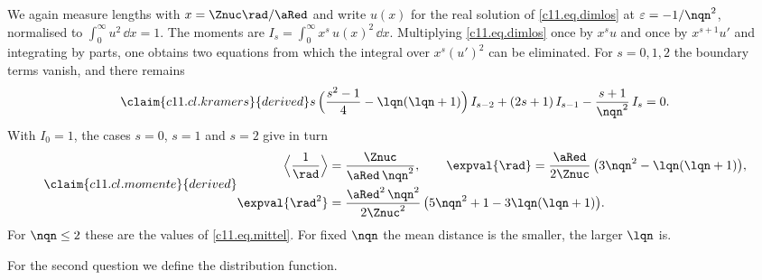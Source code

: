 \begin{vertiefung}[id=c11.v5,
    titel={Moments and distribution function},
    wozu={The Core text computes mean distances for $\nqn \leq 2$ one by one. Here is a
      formula for all states, together with the probability of finding the distance
      below a given radius.},
    voraussetzung={Core~\ref{c11.s7}; for the general case the radial functions of
      Deeper block~\ref{c11.v2}.},
    zurueck={Mean distances and enclosed probabilities can be given for every state
      without numerical integration.}]
  We again measure lengths with $x = \Znuc\rad/\aRed$ and write $u(x)$ for the real solution
  of \eqref{c11.eq.dimlos} at $\varepsilon = -1/\nqn^2$, normalised to
  $\int_0^\infty u^2\,\dd x = 1$. The moments are
  $I_s = \int_0^\infty x^s\,u(x)^2\,\dd x$. Multiplying \eqref{c11.eq.dimlos} once by
  $x^s u$ and once by $x^{s + 1} u'$ and integrating by parts, one obtains two equations
  from which the integral over $x^s (u')^2$ can be eliminated. For $s = 0, 1, 2$ the
  boundary terms vanish, and there remains
  \begin{equation}\label{c11.eq.kramers}\claim{c11.cl.kramers}{derived}
    s\,\Bigl(\frac{s^2 - 1}{4} - \lqn(\lqn + 1)\Bigr)\,I_{s - 2}
    + (2s + 1)\,I_{s - 1} - \frac{s + 1}{\nqn^2}\,I_s = 0 .
  \end{equation}
  With $I_0 = 1$, the cases $s = 0$, $s = 1$ and $s = 2$ give in turn
  \begin{equation}\label{c11.eq.momente}\claim{c11.cl.momente}{derived}
    \begin{aligned}
      \Bigl\langle \frac{1}{\rad} \Bigr\rangle &= \frac{\Znuc}{\aRed\,\nqn^2},
      \qquad
      \expval{\rad} = \frac{\aRed}{2\Znuc}\,\bigl(3\nqn^2 - \lqn(\lqn + 1)\bigr), \\
      \expval{\rad^2} &= \frac{\aRed^2\,\nqn^2}{2\Znuc^2}\,
        \bigl(5\nqn^2 + 1 - 3\lqn(\lqn + 1)\bigr).
    \end{aligned}
  \end{equation}
  For $\nqn \leq 2$ these are the values of \eqref{c11.eq.mittel}. For fixed $\nqn$ the
  mean distance is the smaller, the larger $\lqn$ is.

  For the second question we define the distribution function.



\end{vertiefung}
